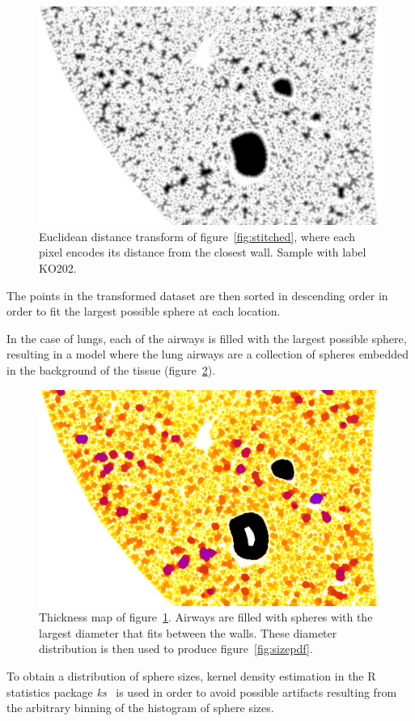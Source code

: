 \begin{figure}[htb]
    \centering
    \includegraphics[width=\textwidth]{gfx/lung-paper-figures/KO202_DR_700.png}
    \caption[Euclidean distance transform.]{Euclidean distance transform of figure~\ref{fig:stitched},
where each pixel encodes its distance from the closest wall. Sample with
label KO202.}
    \label{fig:distance-ridge}
\end{figure}
The points in the transformed dataset are then sorted in descending order in
order to fit the largest possible sphere at each location.

In the case of lungs, each of the airways is filled with the largest possible
sphere, resulting in a model where the lung airways are a collection of
spheres embedded in the background of the tissue
(figure~\ref{fig:thickness-map}).
\begin{figure}[htb]
    \centering
    \includegraphics[width=\textwidth]{gfx/lung-paper-figures/KO202_TM_700.png}
    \caption[Local thickness map.]{Thickness map of
        figure~\ref{fig:distance-ridge}. Airways are filled with spheres
        with the largest diameter that fits between the walls. These
        diameter distribution is then used to produce
        figure~\ref{fig:sizepdf}.}
    \label{fig:thickness-map}
\end{figure}
To obtain a distribution of sphere sizes, kernel density estimation in the R
statistics package \emph{ks}~\parencite{JSSv021i07} is used in order to avoid possible artifacts
resulting from the arbitrary binning of the histogram of sphere sizes.

